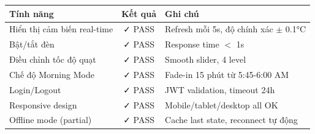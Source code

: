 \begin{center}
\begin{tabular}{|l|c|l|}
\hline
\textbf{Tính năng} & \textbf{Kết quả} & \textbf{Ghi chú} \\
\hline
Hiển thị cảm biến real-time & ✓ PASS & Refresh mỗi 5s, độ chính xác $\pm$ 0.1°C \\
\hline
Bật/tắt đèn & ✓ PASS & Response time $<$ 1s \\
\hline
Điều chỉnh tốc độ quạt & ✓ PASS & Smooth slider, 4 level \\
\hline
Chế độ Morning Mode & ✓ PASS & Fade-in 15 phút từ 5:45-6:00 AM \\
\hline
Login/Logout & ✓ PASS & JWT validation, timeout 24h \\
\hline
Responsive design & ✓ PASS & Mobile/tablet/desktop all OK \\
\hline
Offline mode (partial) & ✓ PASS & Cache last state, reconnect tự động \\
\hline
\end{tabular}
\end{center}

